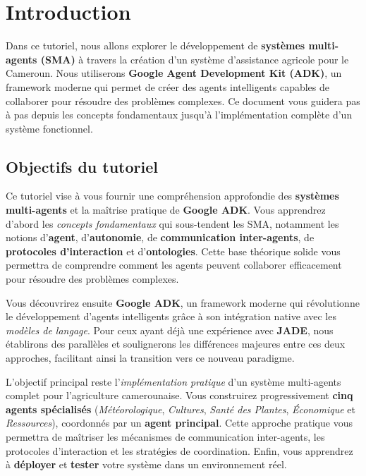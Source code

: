 \chapter*{Introduction}

Dans ce tutoriel, nous allons explorer le développement de \textbf{systèmes multi-agents (SMA)} à travers la création d'un système d'assistance agricole pour le Cameroun. Nous utiliserons \textbf{Google Agent Development Kit (ADK)}, un framework moderne qui permet de créer des agents intelligents capables de collaborer pour résoudre des problèmes complexes. Ce document vous guidera pas à pas depuis les concepts fondamentaux jusqu'à l'implémentation complète d'un système fonctionnel.

\section*{Objectifs du tutoriel}

Ce tutoriel vise à vous fournir une compréhension approfondie des \textbf{systèmes multi-agents} et la maîtrise pratique de \textbf{Google ADK}. Vous apprendrez d'abord les \emph{concepts fondamentaux} qui sous-tendent les SMA, notamment les notions d'\textbf{agent}, d'\textbf{autonomie}, de \textbf{communication inter-agents}, de \textbf{protocoles d'interaction} et d'\textbf{ontologies}. Cette base théorique solide vous permettra de comprendre comment les agents peuvent collaborer efficacement pour résoudre des problèmes complexes.

Vous découvrirez ensuite \textbf{Google ADK}, un framework moderne qui révolutionne le développement d'agents intelligents grâce à son intégration native avec les \emph{modèles de langage}. Pour ceux ayant déjà une expérience avec \textbf{JADE}, nous établirons des parallèles et soulignerons les différences majeures entre ces deux approches, facilitant ainsi la transition vers ce nouveau paradigme.

L'objectif principal reste l'\emph{implémentation pratique} d'un système multi-agents complet pour l'agriculture camerounaise. Vous construirez progressivement \textbf{cinq agents spécialisés} (\emph{Météorologique}, \emph{Cultures}, \emph{Santé des Plantes}, \emph{Économique} et \emph{Ressources}), coordonnés par un \textbf{agent principal}. Cette approche pratique vous permettra de maîtriser les mécanismes de communication inter-agents, les protocoles d'interaction et les stratégies de coordination. Enfin, vous apprendrez à \textbf{déployer} et \textbf{tester} votre système dans un environnement réel.

